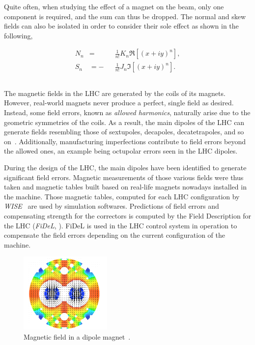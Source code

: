 Quite often, when studying the effect of a magnet on the beam, only one component is required, and
the sum can thus be dropped.
The normal and skew fields can also be isolated in order to consider their sole effect as shown
in the following,

\begin{equation}
    \begin{aligned}
        N_n &=  &&\frac{1}{n!} K_n \Re \left[ (x+iy)^n \right], \\
        S_n &= -&&\frac{1}{n!} J_n \Im \left[ (x+iy)^n \right].
    \end{aligned}
    \label{eq:normal_skew_hamiltonian_magnet}
\end{equation}



\subsection{}
The magnetic fields in the LHC are generated by the coils of its magnets. However, real-world
magnets never produce a perfect, single field as desired. Instead, some field errors, known as
\textit{allowed harmonics}, naturally arise due to the geometric symmetries of the coils. As a
result, the main dipoles of the LHC can generate fields resembling those of sextupoles, decapoles,
decatetrapoles, and so on~\cite{deniau_magnetic_2009}. Additionally, manufacturing imperfections
contribute to field errors beyond the allowed ones, an example being octupolar errors seen in
the LHC dipoles.

During the design of the LHC, the main dipoles have been identified to generate significant field
errors. Magnetic measurements of those various fields were thus taken and magnetic tables built
based on real-life magnets nowadays installed in the machine. Those magnetic tables, computed for
each LHC configuration by \textit{WISE}~\cite{p_hagen_wise_2006} are used by simulation softwares.
Predictions of field errors and compensating strength for the correctors is computed by the Field
Description for the LHC (\textit{FiDeL}, \cite{noauthor_fidel_2021}). FiDeL is used in the LHC
control system in operation to compensate the field errors depending on the current configuration of
the machine.

\begin{figure}[!htb]
    \centering
    \includegraphics[width=0.4\textwidth]{./images/main_dipole_fields.png}
    \caption{Magnetic field in a dipole magnet~\cite{deniau_magnetic_2009}.}
    \label{fig:decapoles:magnetic_field_dipole}
\end{figure}

\FloatBarrier
